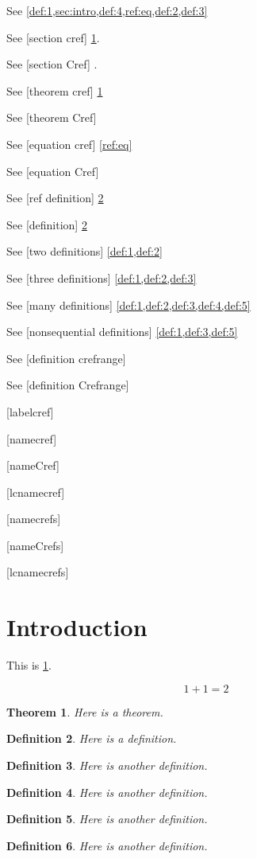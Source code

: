 \documentclass{amsart}
\newtheorem{theorem}{Theorem}
\newtheorem{definition}[theorem]{Definition}
\begin{document}
See \cref{def:1,sec:intro,def:4,ref:eq,def:2,def:3} 

See [section cref] \cref{sec:intro}.

See [section Cref] .

See [theorem cref] \cref{thm:1}

See [theorem Cref] 

See [equation cref] \cref{ref:eq}

See [equation Cref] 

See [ref definition] \ref{def:1}

See [definition] \cref{def:1}

See [two definitions] \cref{def:1,def:2}

See [three definitions] \cref{def:1,def:2,def:3}

See [many definitions] \cref{def:1,def:2,def:3,def:4,def:5}

See [nonsequential definitions] \cref{def:1,def:3,def:5}

See [definition crefrange] 

See [definition Crefrange] 

[labelcref] 

[namecref] 

[nameCref] 

[lcnamecref] 

[namecrefs] 

[nameCrefs] 

[lcnamecrefs] 

\section{Introduction}
\label{sec:intro}

This is \cref{sec:intro}.

\begin{equation}
\label{ref:eq}
1 + 1 = 2
\end{equation}

\begin{theorem}\label{thm:1}
Here is a theorem.
\end{theorem}

\begin{definition}
\label{def:1}
Here is a definition.
\end{definition}

\begin{definition}
\label{def:2}
Here is another definition.
\end{definition}

\begin{definition}
\label{def:3}
Here is another definition.
\end{definition}

\begin{definition}
\label{def:4}
Here is another definition.
\end{definition}

\begin{definition}
\label{def:5}
Here is another definition.
\end{definition}
\end{document}
